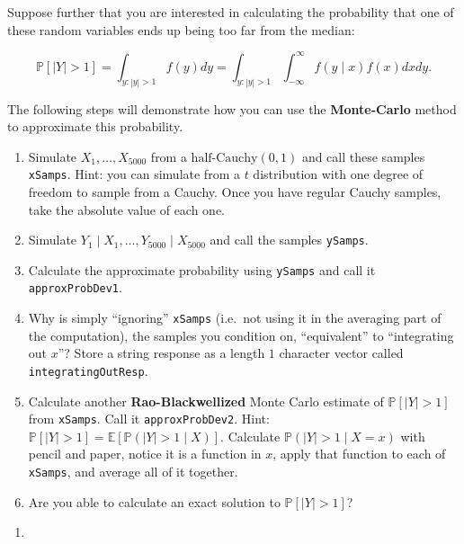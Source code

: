\documentclass[12pt,krantz2]{krantz}
\begin{document}
Suppose further that you are interested in calculating the probability that one of these random variables ends up being too far from the median:

\begin{equation} 
\mathbb{P}[|Y| > 1] = \int_{y : |y| > 1} f(y)dy = \int_{y : |y| > 1} \int_{-\infty}^\infty  f(y \mid x) f(x) dx dy.
\end{equation}

The following steps will demonstrate how you can use the \textbf{Monte-Carlo} \citep{monte-carlo-stat-methods} method to approximate this probability.

\begin{enumerate}
\def\labelenumi{\alph{enumi})}
\item
  Simulate \(X_1, \ldots, X_{5000}\) from a \(\text{half-Cauchy}(0, 1)\) and call these samples \texttt{xSamps}. Hint: you can simulate from a \(t\) distribution with one degree of freedom to sample from a Cauchy. Once you have regular Cauchy samples, take the absolute value of each one.
\item
  Simulate \(Y_1 \mid X_1, \ldots, Y_{5000} \mid X_{5000}\) and call the samples \texttt{ySamps}.
\item
  Calculate the approximate probability using \texttt{ySamps} and call it \texttt{approxProbDev1}.
\item
  Why is simply ``ignoring'' \texttt{xSamps} (i.e.~not using it in the averaging part of the computation), the samples you condition on, ``equivalent'' to ``integrating out \(x\)''? Store a string response as a length \(1\) character vector called \texttt{integratingOutResp}.
\item
  Calculate another \textbf{Rao-Blackwellized} Monte Carlo estimate of \(\mathbb{P}[|Y| > 1]\) from \texttt{xSamps}. Call it \texttt{approxProbDev2}. Hint: \(\mathbb{P}[|Y| > 1] = \mathbb{E}[\mathbb{P}(|Y| > 1 \mid X) ]\). Calculate \(\mathbb{P}(|Y| > 1 \mid X=x)\) with pencil and paper, notice it is a function in \(x\), apply that function to each of \texttt{xSamps}, and average all of it together.
\item
  Are you able to calculate an exact solution to \(\mathbb{P}[|Y| > 1]\)?
\end{enumerate}

\begin{enumerate}
\def\labelenumi{\arabic{enumi}.}
\setcounter{enumi}{6}
\item
\end{enumerate}
\end{document}
